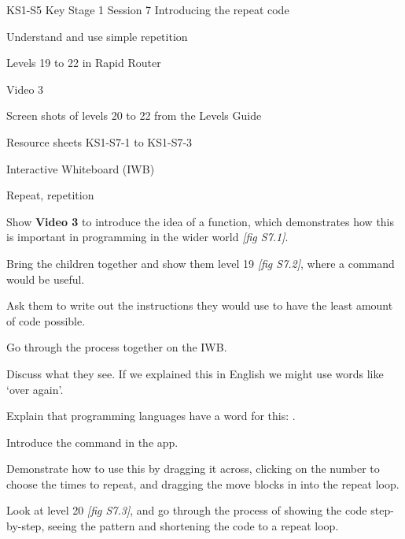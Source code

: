 \documentclass{../../../lessonplan}
\begin{document}
\lessonplantitle
    {KS1-S5}
    {Key Stage 1 Session 7}
    {Introducing the repeat code}

\preamble
    {
    \item Understand and use simple repetition
    }
    {
    \item Levels 19 to 22 in Rapid Router
    \item Video 3
    \item Screen shots of levels 20 to 22 from the Levels Guide
    \item Resource sheets KS1-S7-1 to KS1-S7-3
    \item Interactive Whiteboard (IWB)
    }
    {
    \item Repeat, repetition
    }

\begin{lessonplan}

Show \textbf{Video 3} to introduce the idea of a  function, which demonstrates how this is important in programming in the wider world \textit{[fig S7.1]}.


Bring the children together and show them level 19 \textit{[fig S7.2]}, where a  command would be useful.


Ask them to write out the instructions they would use to have the least amount of code possible.

Go through the process together on the IWB.


Discuss what they see.
If we explained this in English we might use words like `over again'.

Explain that programming languages have a word for this: .

Introduce the  command in the app.


Demonstrate how to use this by dragging it across, clicking on the number to choose the times to repeat, and dragging the move blocks in into the repeat loop.

Look at level 20 \textit{[fig S7.3]}, and go through the process of showing the code step-by-step, seeing the pattern and shortening the code to a repeat loop.



\end{lessonplan}
\end{document}
